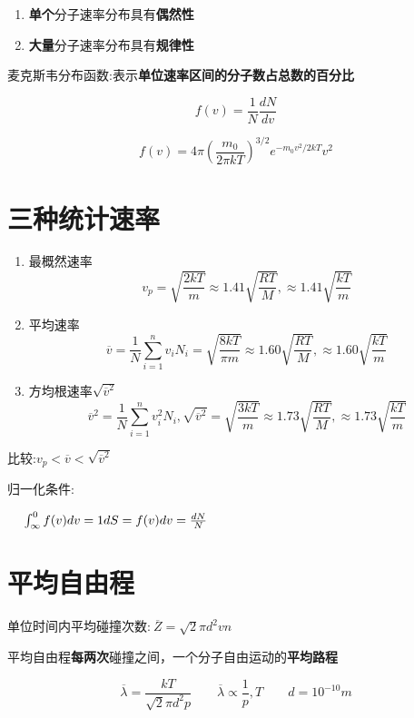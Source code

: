 \begin{enumerate}
    \item \textbf{单个}分子速率分布具有\textbf{偶然性}
    \item \textbf{大量}分子速率分布具有\textbf{规律性}
\end{enumerate}

麦克斯韦分布函数:表示\textbf{单位速率区间的分子数占总数的百分比}

\begin{equation}
    f(v)=\frac{1}{N}\frac{dN}{dv}
\end{equation}

\begin{equation}
    f(v)=4\pi \left(\frac{m_0}{2\pi kT}\right)^{3/2}e^{-m_0v^2/2kT}v^2
\end{equation}

\section{三种统计速率}

\begin{enumerate}

    \item 最概然速率
          \begin{equation}
              v_p=\sqrt{\frac{2kT}{m}}\approx 1.41\sqrt{\frac{RT}{M}},\approx 1.41\sqrt{\frac{kT}{m}}
          \end{equation}

    \item 平均速率
          \begin{equation}
              \overline {v}=\frac{1}{N}\sum_{i=1}^n{v_iN_i}=\sqrt{\frac{8kT}{\pi m}}\approx 1.60\sqrt{\frac{RT}{M}},\approx 1.60\sqrt{\frac{kT}{m}}
          \end{equation}

    \item 方均根速率$\sqrt{\overline{v}^2}$
          \begin{equation}
              \overline{v}^2=\frac{1}{N}\sum_{i=1}^n{v_i^2N_i},\sqrt{\overline{v}^2}=\sqrt{\frac{3kT}{m}}\approx 1.73\sqrt{\frac{RT}{M}},\approx 1.73\sqrt{\frac{kT}{m}}
          \end{equation}

\end{enumerate}

比较:$v_p<\overline{v}<\sqrt{\overline{v}^2}$

归一化条件:

$\hspace{3ex} \int^{0}_{\infty}{f(v)dv}=1\\dS=f(v)dv=\frac{dN}{N}$

\section{平均自由程}

单位时间内平均碰撞次数:$~\overline{Z}=\sqrt{2}\pi{}d^2vn$

平均自由程\textbf{每两次}碰撞之间，一个分子自由运动的\textbf{平均路程}

\begin{equation}
    \overline{\lambda}=\frac{kT}{\sqrt{2}\pi{}d^2p}\qquad\overline{\lambda{}}\propto\frac{1}{p},T\qquad d=10^{-10}m
\end{equation}

\newpage